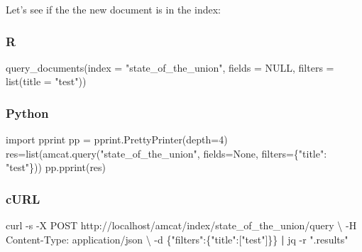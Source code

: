 \documentclass[
  letterpaper,
  DIV=11,
  numbers=noendperiod]{scrreprt}
\newenvironment{Shaded}{\begin{snugshade}}{\end{snugshade}}
\newcommand{\AttributeTok}[1]{\textcolor[rgb]{0.40,0.45,0.13}{#1}}
\newcommand{\BuiltInTok}[1]{\textcolor[rgb]{0.00,0.23,0.31}{#1}}
\newcommand{\ConstantTok}[1]{\textcolor[rgb]{0.56,0.35,0.01}{#1}}
\newcommand{\DataTypeTok}[1]{\textcolor[rgb]{0.68,0.00,0.00}{#1}}
\newcommand{\DecValTok}[1]{\textcolor[rgb]{0.68,0.00,0.00}{#1}}
\newcommand{\ExtensionTok}[1]{\textcolor[rgb]{0.00,0.23,0.31}{#1}}
\newcommand{\FunctionTok}[1]{\textcolor[rgb]{0.28,0.35,0.67}{#1}}
\newcommand{\ImportTok}[1]{\textcolor[rgb]{0.00,0.46,0.62}{#1}}
\newcommand{\KeywordTok}[1]{\textcolor[rgb]{0.00,0.23,0.31}{\textbf{#1}}}
\newcommand{\NormalTok}[1]{\textcolor[rgb]{0.00,0.23,0.31}{#1}}
\newcommand{\OperatorTok}[1]{\textcolor[rgb]{0.37,0.37,0.37}{#1}}
\newcommand{\StringTok}[1]{\textcolor[rgb]{0.13,0.47,0.30}{#1}}
\newcommand{\VariableTok}[1]{\textcolor[rgb]{0.07,0.07,0.07}{#1}}
\begin{document}
Let's see if the the new document is in the index:

\subsubsection{R}

\begin{Shaded}
\begin{Highlighting}[]
\FunctionTok{query\_documents}\NormalTok{(}\AttributeTok{index =} \StringTok{"state\_of\_the\_union"}\NormalTok{, }\AttributeTok{fields =} \ConstantTok{NULL}\NormalTok{, }\AttributeTok{filters =} \FunctionTok{list}\NormalTok{(}\AttributeTok{title =} \StringTok{"test"}\NormalTok{))}
\end{Highlighting}
\end{Shaded}

\subsubsection{Python}

\begin{Shaded}
\begin{Highlighting}[]
\ImportTok{import}\NormalTok{ pprint}
\NormalTok{pp }\OperatorTok{=}\NormalTok{ pprint.PrettyPrinter(depth}\OperatorTok{=}\DecValTok{4}\NormalTok{)}
\NormalTok{res}\OperatorTok{=}\BuiltInTok{list}\NormalTok{(amcat.query(}\StringTok{"state\_of\_the\_union"}\NormalTok{, fields}\OperatorTok{=}\VariableTok{None}\NormalTok{, filters}\OperatorTok{=}\NormalTok{\{}\StringTok{"title"}\NormalTok{: }\StringTok{"test"}\NormalTok{\}))}
\NormalTok{pp.pprint(res)}
\end{Highlighting}
\end{Shaded}

\subsubsection{cURL}

\begin{Shaded}
\begin{Highlighting}[]
\ExtensionTok{curl} \AttributeTok{{-}s} \AttributeTok{{-}X}\NormalTok{ POST http://localhost/amcat/index/state\_of\_the\_union/query }\DataTypeTok{\textbackslash{}}
  \AttributeTok{{-}H} \StringTok{\textquotesingle{}Content{-}Type: application/json\textquotesingle{}} \DataTypeTok{\textbackslash{}}
  \AttributeTok{{-}d} \StringTok{\textquotesingle{}\{"filters":\{"title":["test"]\}\}\textquotesingle{}} \KeywordTok{|} \ExtensionTok{jq} \AttributeTok{{-}r} \StringTok{".results"}
\end{Highlighting}
\end{Shaded}
\end{document}

